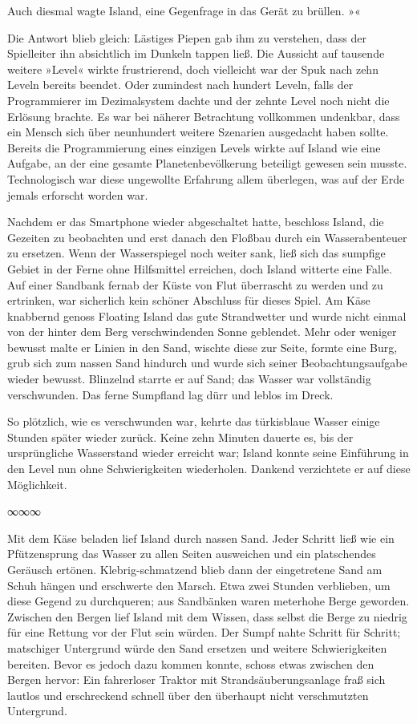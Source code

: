 
Auch diesmal wagte Island, eine Gegenfrage in das Gerät zu brüllen. »«

Die Antwort blieb gleich: Lästiges Piepen gab ihm zu verstehen, dass der Spielleiter ihn absichtlich im Dunkeln tappen ließ. Die Aussicht auf tausende weitere »Level« wirkte frustrierend, doch vielleicht war der Spuk nach zehn Leveln bereits beendet. Oder zumindest nach hundert Leveln, falls der Programmierer im Dezimalsystem dachte und der zehnte Level noch nicht die Erlösung brachte. Es war bei näherer Betrachtung vollkommen undenkbar, dass ein Mensch sich über neunhundert weitere Szenarien ausgedacht haben sollte. Bereits die Programmierung eines einzigen Levels wirkte auf Island wie eine Aufgabe, an der eine gesamte Planetenbevölkerung beteiligt gewesen sein musste. Technologisch war diese ungewollte Erfahrung allem überlegen, was auf der Erde jemals erforscht worden war.

Nachdem er das Smartphone wieder abgeschaltet hatte, beschloss Island, die Gezeiten zu beobachten und erst danach den Floßbau durch ein Wasserabenteuer zu ersetzen. Wenn der Wasserspiegel noch weiter sank, ließ sich das sumpfige Gebiet in der Ferne ohne Hilfsmittel erreichen, doch Island witterte eine Falle. Auf einer Sandbank fernab der Küste von Flut überrascht zu werden und zu ertrinken, war sicherlich kein schöner Abschluss für dieses Spiel. Am Käse knabbernd genoss Floating Island das gute Strandwetter und wurde nicht einmal von der hinter dem Berg verschwindenden Sonne geblendet. Mehr oder weniger bewusst malte er Linien in den Sand, wischte diese zur Seite, formte eine Burg, grub sich zum nassen Sand hindurch und wurde sich seiner Beobachtungsaufgabe wieder bewusst. Blinzelnd starrte er auf Sand; das Wasser war vollständig verschwunden. Das ferne Sumpfland lag dürr und leblos im Dreck.

So plötzlich, wie es verschwunden war, kehrte das türkisblaue Wasser einige Stunden später wieder zurück. Keine zehn Minuten dauerte es, bis der ursprüngliche Wasserstand wieder erreicht war; Island konnte seine Einführung in den Level nun ohne Schwierigkeiten wiederholen. Dankend verzichtete er auf diese Möglichkeit.

\begin{center}
∞∞∞
\end{center}

Mit dem Käse beladen lief Island durch nassen Sand. Jeder Schritt ließ wie ein Pfützensprung das Wasser zu allen Seiten ausweichen und ein platschendes Geräusch ertönen. Klebrig-schmatzend blieb dann der eingetretene Sand am Schuh hängen und erschwerte den Marsch. Etwa zwei Stunden verblieben, um diese Gegend zu durchqueren; aus Sandbänken waren meterhohe Berge geworden. Zwischen den Bergen lief Island mit dem Wissen, dass selbst die Berge zu niedrig für eine Rettung vor der Flut sein würden. Der Sumpf nahte Schritt für Schritt; matschiger Untergrund würde den Sand ersetzen und weitere Schwierigkeiten bereiten. Bevor es jedoch dazu kommen konnte, schoss etwas zwischen den Bergen hervor: Ein fahrerloser Traktor mit Strandsäuberungsanlage fraß sich lautlos und erschreckend schnell über den überhaupt nicht verschmutzten Untergrund.

